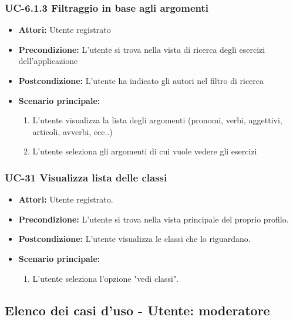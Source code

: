 \subsubsection{UC-6.1.3 Filtraggio in base agli argomenti}
	\begin{itemize}
		\item \textbf{Attori:} Utente registrato
		\item \textbf{Precondizione: } L'utente si trova nella vista di ricerca degli esercizi dell'applicazione
		\item \textbf{Postcondizione: } L'utente ha indicato gli autori nel filtro di ricerca 
		\item \textbf{Scenario principale:}
		\begin{enumerate}
			\item L'utente visualizza la lista degli argomenti (pronomi, verbi, aggettivi, articoli, avverbi, ecc..)
			\item L'utente seleziona gli argomenti di cui vuole vedere gli esercizi
		\end{enumerate}
	\end{itemize}

\subsubsection{UC-31 Visualizza lista delle classi}		
\begin{itemize}
	\item \textbf{Attori:} Utente registrato.
	\item \textbf{Precondizione:} L'utente si trova nella vista principale del proprio profilo.
	\item \textbf{Postcondizione:} L'utente visualizza le classi che lo riguardano.
	\item \textbf{Scenario principale:}
	\begin{enumerate}
		\item L'utente seleziona l'opzione "vedi classi".
	\end{enumerate}		
\end{itemize}

\subsection{Elenco dei casi d'uso - Utente: moderatore}	
